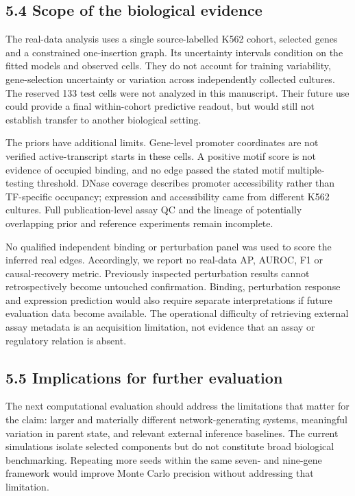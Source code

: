 \documentclass[
  11pt,
]{article}
\begin{document}
\subsection{5.4 Scope of the biological
evidence}\label{scope-of-the-biological-evidence}

The real-data analysis uses a single source-labelled K562 cohort,
selected genes and a constrained one-insertion graph. Its uncertainty
intervals condition on the fitted models and observed cells. They do not
account for training variability, gene-selection uncertainty or
variation across independently collected cultures. The reserved 133 test
cells were not analyzed in this manuscript. Their future use could
provide a final within-cohort predictive readout, but would still not
establish transfer to another biological setting.

The priors have additional limits. Gene-level promoter coordinates are
not verified active-transcript starts in these cells. A positive motif
score is not evidence of occupied binding, and no edge passed the stated
motif multiple-testing threshold. DNase coverage describes promoter
accessibility rather than TF-specific occupancy; expression and
accessibility came from different K562 cultures. Full publication-level
assay QC and the lineage of potentially overlapping prior and reference
experiments remain incomplete.

No qualified independent binding or perturbation panel was used to score
the inferred real edges. Accordingly, we report no real-data AP, AUROC,
F1 or causal-recovery metric. Previously inspected perturbation results
cannot retrospectively become untouched confirmation. Binding,
perturbation response and expression prediction would also require
separate interpretations if future evaluation data become available. The
operational difficulty of retrieving external assay metadata is an
acquisition limitation, not evidence that an assay or regulatory
relation is absent.

\subsection{5.5 Implications for further
evaluation}\label{implications-for-further-evaluation}

The next computational evaluation should address the limitations that
matter for the claim: larger and materially different network-generating
systems, meaningful variation in parent state, and relevant external
inference baselines. The current simulations isolate selected components
but do not constitute broad biological benchmarking. Repeating more
seeds within the same seven- and nine-gene framework would improve Monte
Carlo precision without addressing that limitation.
\end{document}
